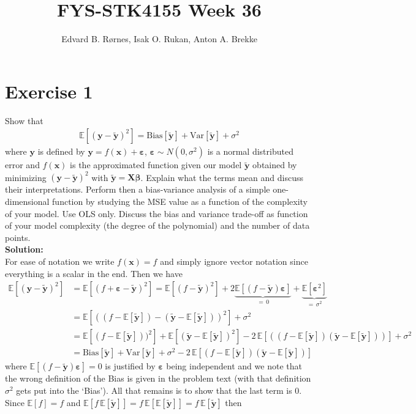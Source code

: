 \documentclass{article}
\title{FYS-STK4155 Week 36}
\author{Edvard B. Rørnes, Isak O. Rukan, Anton A. Brekke}
\begin{document}
	\maketitle
	\section*{Exercise 1}
	Show that
	\begin{align}
		\mathbb{E}[(\bm y-\tilde{\bm y})^2]=\text{Bias}[\tilde{\bm y}]+\text{Var}[\tilde{\bm y}]+\sigma^2
		\label{eq:MSE-bias-var}
	\end{align}
	where $\bm y$ is defined by $\bm y=f(\bm x)+\bm \varepsilon$, $\bm \varepsilon\sim N(0,\sigma^2)$ is a normal distributed error and $f(\bm x)$ is the approximated function given our model $\tilde{\bm y}$ obtained by minimizing $(\bm y-\tilde{\bm y})^2$ with $\tilde{\bm y}=\bm X\bm \beta$. Explain what the terms mean and discuss their interpretations. Perform then a bias-variance analysis of a simple one-dimensional function by studying the MSE value as a function of the complexity of your model. Use OLS only. Discuss the bias and variance trade-off as function of your model complexity (the degree of the polynomial) and the number of data points.\\
	\textbf{Solution:} \\
	For ease of notation we write $f(\bm x)=f$ and simply ignore vector notation since everything is a scalar in the end. Then we have
	\begin{align*}
		\mathbb{E}[(\bm y-\tilde{\bm y})^2]&=\mathbb{E}[(f+\bm\varepsilon-\tilde{\bm y})^2]=\mathbb{E}[(f-\tilde{\bm y})^2]+2\underbrace{\mathbb{E}[(f-\tilde{\bm y})\bm\varepsilon]}_{=\,0}+\underbrace{\mathbb{E}[\bm\varepsilon^2]}_{=\,\sigma^2}\\
		&=\mathbb{E}[((f-\mathbb{E}[\tilde{\bm y}])-(\tilde{\bm y}-\mathbb{E}[\tilde{\bm y}]))^2]+\sigma^2\\
		&=\mathbb{E}[(f-\mathbb{E}[\tilde{\bm y}]))^2]+\mathbb{E}[(\tilde{\bm y}-\mathbb{E}[\tilde{\bm y}])^2]-2\,\mathbb{E}[((f-\mathbb{E}[\tilde{\bm y}])(\tilde{\bm y}-\mathbb{E}[\tilde{\bm y}]))]+\sigma^2\\
		&=\text{Bias}[\tilde{\bm y}]+\text{Var}[\tilde{\bm y}]+\sigma^2-2\,\mathbb{E}[(f-\mathbb{E}[\tilde{\bm y}])(\tilde{\bm y}-\mathbb{E}[\tilde{\bm y}])]
	\end{align*}
	where $\mathbb{E}[(f-\tilde{\bm y})\bm\varepsilon]=0$ is justified by $\bm\varepsilon$ being independent and we note that the wrong definition of the Bias is given in the problem text (with that definition $\sigma^2$ gets put into the `Bias'). All that remains is to show that the last term is 0. Since $\mathbb{E}[f]=f$ and $\mathbb{E}[f\,\mathbb{E}[\tilde{\bm y}]]=f\,\mathbb{E}[\mathbb{E}[\tilde{\bm y}]]=f\,\mathbb{E}[\tilde{\bm y}]$ then
\end{document}
